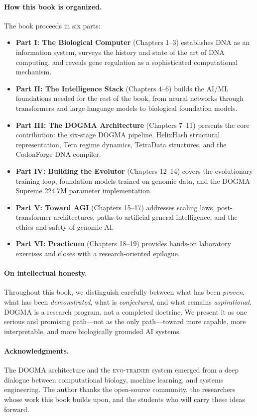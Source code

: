 \documentclass[11pt,openany]{book}
\begin{document}
\paragraph{How this book is organized.} The book proceeds in six parts:

\begin{itemize}[leftmargin=1.5em]
  \item \textbf{Part I: The Biological Computer} (Chapters 1--3) establishes DNA as an information system, surveys the history and state of the art of DNA computing, and reveals gene regulation as a sophisticated computational mechanism.
  \item \textbf{Part II: The Intelligence Stack} (Chapters 4--6) builds the AI/ML foundations needed for the rest of the book, from neural networks through transformers and large language models to biological foundation models.
  \item \textbf{Part III: The DOGMA Architecture} (Chapters 7--11) presents the core contribution: the six-stage DOGMA pipeline, HelixHash structural representation, Tera regime dynamics, TetraData structures, and the CodonForge DNA compiler.
  \item \textbf{Part IV: Building the Evolutor} (Chapters 12--14) covers the evolutionary training loop, foundation models trained on genomic data, and the DOGMA-Supreme 224.7M parameter implementation.
  \item \textbf{Part V: Toward AGI} (Chapters 15--17) addresses scaling laws, post-transformer architectures, paths to artificial general intelligence, and the ethics and safety of genomic AI.
  \item \textbf{Part VI: Practicum} (Chapters 18--19) provides hands-on laboratory exercises and closes with a research-oriented epilogue.
\end{itemize}

\paragraph{On intellectual honesty.} Throughout this book, we distinguish carefully between what has been \emph{proven}, what has been \emph{demonstrated}, what is \emph{conjectured}, and what remains \emph{aspirational}. DOGMA is a research program, not a completed doctrine. We present it as one serious and promising path---not as the only path---toward more capable, more interpretable, and more biologically grounded AI systems.

\paragraph{Acknowledgments.} The DOGMA architecture and the \textsc{evo-trainer} system emerged from a deep dialogue between computational biology, machine learning, and systems engineering. The author thanks the open-source community, the researchers whose work this book builds upon, and the students who will carry these ideas forward.
\end{document}
